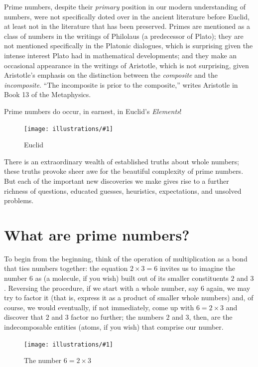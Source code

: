 \documentclass[openany]{book}
\newcommand{\ill}[3]{%
   \begin{figure}[H]%
   \vspace{-2ex}
   \centering%
   \texttt{[image: illustrations/\#1]}%
   \caption{#3}%
   \vspace{-2ex}
    \end{figure}}
\theoremstyle{plain}
\theoremstyle{definition}
\begin{document}
Prime numbers, despite their {\em primary} position in our modern
understanding of numbers, were not specifically doted over in the
ancient literature before Euclid, at least not in the literature that
has been preserved. Primes are mentioned as a class of numbers in the
writings of Philolaus (a predecessor of Plato); they are not mentioned
specifically in the Platonic dialogues, which is surprising
given the intense interest Plato had in mathematical developments; and
they make an occasional appearance in the writings of Aristotle, which
is not surprising, given Aristotle's emphasis on the distinction
between the {\em composite} and the {\em incomposite}. ``The
incomposite is prior to the composite,'' writes Aristotle in Book 13 of
the Metaphysics.


Prime numbers do occur, in earnest, in  Euclid's  {\it Elements}!


\ill{euclid}{.35}{Euclid}


There is an extraordinary wealth of established truths about whole
numbers; these truths provoke sheer awe for the beautiful complexity
of prime numbers. But each of the important new discoveries we make
gives rise to a further richness of questions, educated guesses,
heuristics, expectations, and unsolved problems.








\chapter{What are prime numbers?}\label{ch:what_are_primes}

 To begin from the beginning, think
of the operation of multiplication as a bond that ties numbers
together: the equation $2\times 3= 6$ invites us to imagine the number
$6$ as (a molecule, if you wish) built out of its smaller constituents
$2$ and $3$.  Reversing the procedure, if we start with a whole
number, say $6$ again, we may try to factor it (that is, express it as
a product of smaller whole numbers) and, of course, we would
eventually, if not immediately, come up with $6 = 2\times 3$ and
discover that $2$ and $3$ factor no further; the numbers $2$ and $3$,
then, are the indecomposable entities (atoms, if you wish) that
comprise our number.

\ill{factor_tree_6}{.3}{The number $6 = 2\times 3$}
\end{document}

